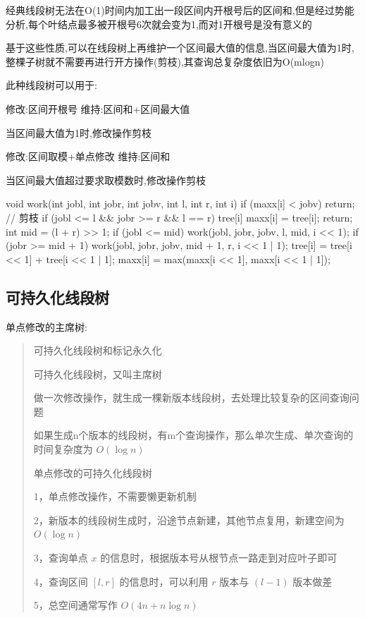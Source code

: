 \documentclass[UTF8,a4paper,11pt]{ctexart}
\newcommand{\topic}[1]{%
  \par\needspace{3\baselineskip}\vspace{0.45em}%
  \noindent{\bfseries\color{Primary}#1}\par\vspace{0.12em}%
}
\begin{document}
经典线段树无法在O(1)时间内加工出一段区间内开根号后的区间和,但是经过势能分析,每个叶结点最多被开根号6次就会变为1,而对1开根号是没有意义的

基于这些性质,可以在线段树上再维护一个区间最大值的信息,当区间最大值为1时,整棵子树就不需要再进行开方操作(剪枝),其查询总复杂度依旧为O(mlogn)

此种线段树可以用于:

修改:区间开根号 维持:区间和+区间最大值

当区间最大值为1时,修改操作剪枝

修改:区间取模+单点修改 维持:区间和

当区间最大值超过要求取模数时,修改操作剪枝

\begin{CodeBlock}
void work(int jobl, int jobr, int jobv, int l, int r, int i) {
    if (maxx[i] < jobv)
        return; // 剪枝
    if (jobl <= l && jobr >= r && l == r) {
        tree[i] %
        maxx[i] = tree[i];
        return;
    }
    int mid = (l + r) >> 1;
    if (jobl <= mid)
        work(jobl, jobr, jobv, l, mid, i << 1);
    if (jobr >= mid + 1)
        work(jobl, jobr, jobv, mid + 1, r, i << 1 | 1);
    tree[i] = tree[i << 1] + tree[i << 1 | 1];
    maxx[i] = max(maxx[i << 1], maxx[i << 1 | 1]);
}
\end{CodeBlock}

\subsection{可持久化线段树}

\topic{单点修改主席树}

单点修改的主席树:

\begin{quote}
可持久化线段树和标记永久化\par
可持久化线段树，又叫主席树\par
做一次修改操作，就生成一棵新版本线段树，去处理比较复杂的区间查询问题\par
如果生成n个版本的线段树，有m个查询操作，那么单次生成、单次查询的时间复杂度为 $O(\log n)$\par
单点修改的可持久化线段树\par
1，单点修改操作，不需要懒更新机制\par
2，新版本的线段树生成时，沿途节点新建，其他节点复用，新建空间为 $O(\log n)$\par
3，查询单点 $x$ 的信息时，根据版本号从根节点一路走到对应叶子即可\par
4，查询区间 $[l,r]$ 的信息时，可以利用 $r$ 版本与 $(l-1)$ 版本做差\par
5，总空间通常写作 $O(4n+n\log n)$\par
\end{quote}
\end{document}
